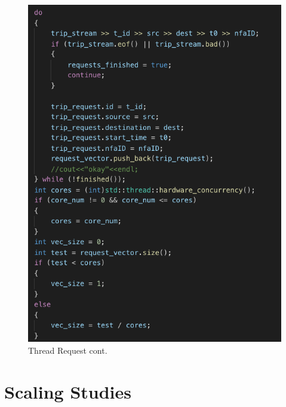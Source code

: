 \documentclass[English]{article}
\theoremstyle{remark}
\numberwithin{equation}{section}
\begin{document}
\begin{figure}[!tbp]
\begin{minipage}[b]{0.4\textwidth}
    \includegraphics[width=\textwidth]{code2.png}
    \caption{Thread Request cont.}
  \end{minipage}
\end{figure}


\section{Scaling Studies}
\label{sec:scalingstudies}
\end{document}
